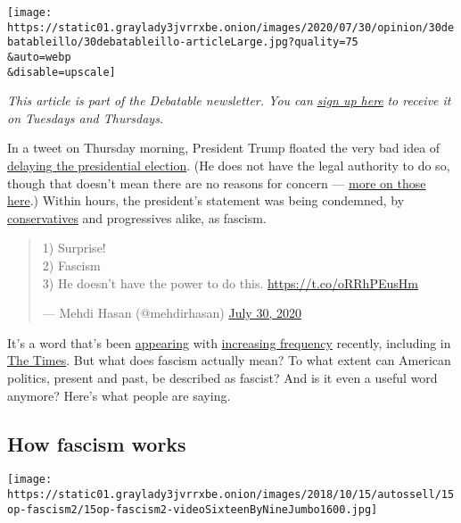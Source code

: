 \texttt{[image: https://static01.graylady3jvrrxbe.onion/images/2020/07/30/opinion/30debatableillo/30debatableillo-articleLarge.jpg?quality=75\\\&auto=webp\\\&disable=upscale]}

\emph{This article is part of the Debatable newsletter. You can}
\href{https://www.nytimes3xbfgragh.onion/newsletters/debatable}{\emph{sign
up here}} \emph{to receive it on Tuesdays and Thursdays.}

In a tweet on Thursday morning, President Trump floated the very bad
idea of
\href{https://www.nytimes3xbfgragh.onion/2020/07/30/us/elections/biden-vs-trump.html}{delaying
the presidential election}. (He does not have the legal authority to do
so, though that doesn't mean there are no reasons for concern ---
\href{https://www.nytimes3xbfgragh.onion/2020/06/11/opinion/trump-2020-election.html}{more
on those here}.) Within hours, the president's statement was being
condemned, by
\href{https://twitter.com/SteveSchmidtSES/status/1288857374506323974}{conservatives}
and progressives alike, as fascism.

\begin{quote}
1) Surprise!\\
2) Fascism\\
3) He doesn't have the power to do this. \url{https://t.co/oRRhPEusHm}

--- Mehdi Hasan (@mehdirhasan)
\href{https://twitter.com/mehdirhasan/status/1288828096590893057?ref_src=twsrc\%5Etfw}{July
30, 2020}
\end{quote}

It's a word that's been
\href{https://www.youtube.com/watch?v=0jb1BMZflXQ}{appearing} with
\href{https://trends.google.com/trends/explore?q=fascism\&geo=US}{increasing
frequency} recently, including in
\href{https://www.nytimes3xbfgragh.onion/2020/06/10/books/fascism-debate-donald-trump.html}{The
Times}. But what does fascism actually mean? To what extent can American
politics, present and past, be described as fascist? And is it even a
useful word anymore? Here's what people are saying.

\hypertarget{how-fascism-works}{%
\subsection{How fascism works}\label{how-fascism-works}}

\texttt{[image: https://static01.graylady3jvrrxbe.onion/images/2018/10/15/autossell/15op-fascism2/15op-fascism2-videoSixteenByNineJumbo1600.jpg]}

